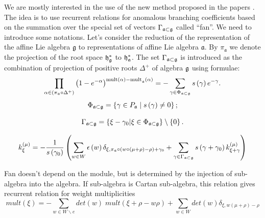 \documentclass[a4paper,12pt]{article}
\theoremstyle{definition} \newtheorem{Def}{Definition}
\begin{document}
We are mostly interested in the use of the new method proposed in the papers
\cite{lyakhovsky1996rra,lyakhovsky2007dub,ilyin812pbc,kulish4sfa}. The
idea is to use recurrent relations for anomalous branching
coefficients based on the summation over the special
set of vectors $\Gamma_{\frak{a}\subset \frak{g}} $ called ``fan''. We
need to introduce some notations. Let's consider the reduction of the
representation of the affine Lie algebra $\mathfrak{g}$ to 
representations of affine Lie algebra $\mathfrak{a}$. By
$\pi_{\mathfrak{a}}$ we denote the projection of the root space
$\frak{h}_{\frak{g}}^{\ast }$ to $\frak{h}_{\frak{a}}^{\ast }$. The
set $\Gamma_{\frak{a}\subset \frak{g}} $ is introduced as the
combination of projection of positive roots $\Delta^{+}$ of algebra
$\frak{g}$ using formulae:
\begin{equation}
  \label{eq:7}
  \prod_{\alpha \in \left( \pi _{\frak{a}}\circ \Delta ^{+}\right) }\left(
    1-e^{-\alpha }\right) ^{\mathrm{{mult}\left( \alpha \right) -{mult}}_{\frak{a%
      }}\mathrm{\left( \alpha \right) }}=-\sum_{\gamma \in \Phi _{\frak{a}\subset 
      \frak{g}}}s\left( \gamma \right) e^{-\gamma }.  
\end{equation}
\begin{equation}
\label{eq:18}
  \Phi _{\frak{a}\subset \frak{g}}=\left\{ \gamma \in P_{\frak{a}}\mid s\left(
      \gamma \right) \neq 0\right\} ;  
\end{equation}

\begin{equation}
\label{eq:19}
  \Gamma_{\frak{a}\subset \frak{g}}=\left\{ \xi -\gamma _{0}|\xi \in \Phi _{%
      \frak{a}\subset \frak{g}}\right\} \setminus \left\{ 0\right\} .
\end{equation}



\begin{equation}
  \label{recurrent-relation}
  k_{\xi }^{\left( \mu \right) }=-\frac{1}{s\left( \gamma _{0}\right) }\left(
    \sum_{w\in W}\epsilon \left( w\right) \delta _{\xi ,\pi _{\frak{a}}\circ
      \left( w\circ (\mu +\rho )-\rho \right) +\gamma _{0}}+\sum_{\gamma \in
      \Gamma _{\frak{a}\subset \frak{g}}}s\left( \gamma +\gamma _{0}\right) k_{\xi
      +\gamma }^{\left( \mu \right) }\right)   
\end{equation}

Fan doesn't depend on the module, but
is determined by the injection of sub-algebra into the algebra. If 
sub-algebra is Cartan sub-algebra, this relation gives recurrent
relation for weight multiplicities
\begin{equation}
  \label{eq:2}
  mult(\xi)=-\sum_{w\in W\backslash e}det(w)\;mult(\xi+\rho-w\rho)+\sum_{w\in W}det(w)\delta_{\xi,w(\mu+\rho)-\rho}
\end{equation}
\end{document}
